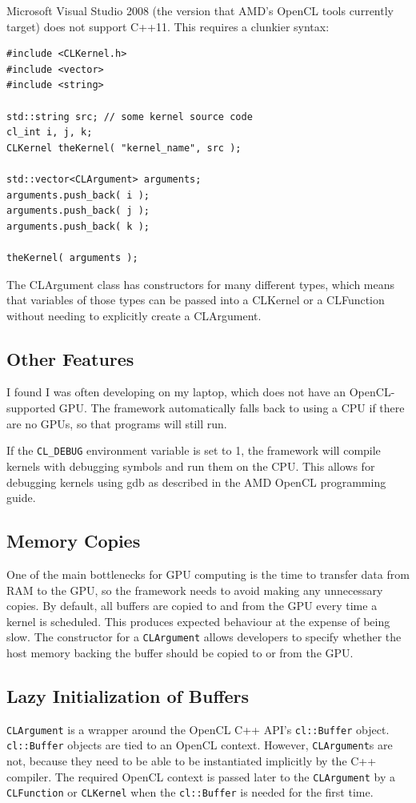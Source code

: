 \documentclass{article}
\begin{document}
Microsoft Visual Studio 2008 (the version that AMD's OpenCL tools currently target) does not support C++11. This requires a clunkier syntax:

\begin{lstlisting}
#include <CLKernel.h>
#include <vector>
#include <string>

std::string src; // some kernel source code
cl_int i, j, k;
CLKernel theKernel( "kernel_name", src );

std::vector<CLArgument> arguments;
arguments.push_back( i ); 
arguments.push_back( j ); 
arguments.push_back( k ); 

theKernel( arguments );
\end{lstlisting}

The CLArgument class has constructors for many different types, which means that variables of those types can be passed into a CLKernel or a CLFunction without needing to explicitly create a CLArgument.

\subsection{Other Features}
I found I was often developing on my laptop, which does not have an OpenCL-supported GPU. The framework automatically falls back to using a CPU if there are no GPUs, so that programs will still run.

If the \texttt{CL\_DEBUG} environment variable is set to 1, the framework will compile kernels with debugging symbols and run them on the CPU. This allows for debugging kernels using gdb as described in the AMD OpenCL programming guide\cite{amdapp}.

\subsection{Memory Copies}
One of the main bottlenecks for GPU computing is the time to transfer data from RAM to the GPU, so the framework needs to avoid making any unnecessary copies. By default, all buffers are copied to and from the GPU every time a kernel is scheduled. This produces expected  behaviour at the expense of being slow. The constructor for a \texttt{CLArgument} allows developers to specify whether the host memory backing the buffer should be copied to or from the GPU.

\subsection{Lazy Initialization of Buffers}
\texttt{CLArgument} is a wrapper around the OpenCL C++ API's \texttt{cl::Buffer} object. \texttt{cl::Buffer} objects are tied to an OpenCL context. However, \texttt{CLArgument}s are not, because they need to be able to be instantiated implicitly by the C++ compiler. The required OpenCL context is passed later to the \texttt{CLArgument} by a \texttt{CLFunction} or \texttt{CLKernel} when the \texttt{cl::Buffer} is needed for the first time.
\end{document}
